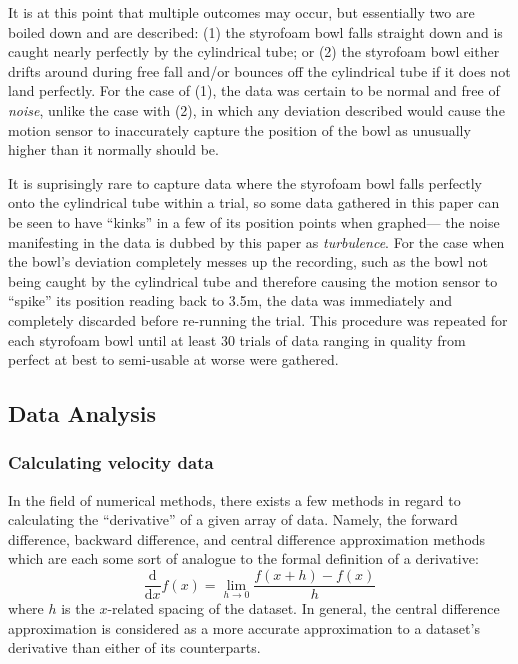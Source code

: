\documentclass[12pt]{article}
\newcommand{\totder}[2][]{\frac{\mathrm{d}#1}{\mathrm{d}#2}} %
\begin{document}
\begin{multicols}{2}
It is at this point that multiple outcomes may occur, but essentially two are boiled down and are described:
(1) the styrofoam bowl falls straight down and is caught nearly perfectly by the cylindrical tube;
or (2) the styrofoam bowl either drifts around during free fall and/or bounces off the cylindrical tube if it does not land perfectly.
For the case of (1), the data was certain to be normal and free of \textit{noise}, unlike the case with (2),
in which any deviation described would cause the motion sensor to inaccurately capture the position of the bowl as unusually higher than it normally should be.

It is suprisingly rare to capture data where the styrofoam bowl falls perfectly onto the cylindrical tube within a trial,
so some data gathered in this paper can be seen to have ``kinks'' in a few of its position points when graphed--- the noise manifesting in the data is dubbed by this paper as \textit{turbulence}.
For the case when the bowl's deviation completely messes up the recording,
such as the bowl not being caught by the cylindrical tube and therefore causing the motion sensor to ``spike'' its position reading back to 3.5m,
the data was immediately and completely discarded before re-running the trial.
This procedure was repeated for each styrofoam bowl until at least 30 trials of data ranging in quality from perfect at best to semi-usable at worse were gathered.

\subsection{Data Analysis}
\subsubsection{Calculating velocity data}
In the field of numerical methods, there exists a few methods in regard to calculating the ``derivative'' of a given array of data.
Namely, the forward difference, backward difference, and central difference approximation methods which are each some sort of analogue to the formal definition of a derivative:
$$\totder[]{x}f(x)=\lim_{h\to0}\frac{f(x+h)-f(x)}{h}$$
where $h$ is the $x$-related spacing of the dataset.
In general, the central difference approximation is considered as a more accurate approximation to a dataset's derivative than either of its counterparts.


\end{multicols}
\end{document}
